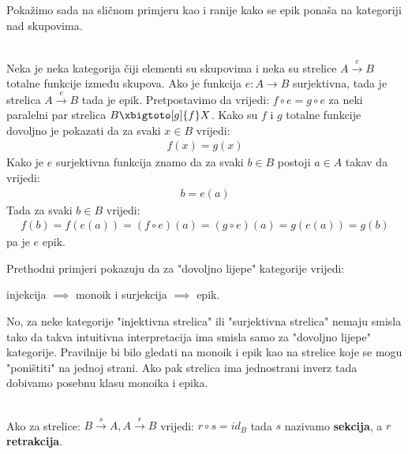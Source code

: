   Pokažimo sada na sličnom primjeru kao i ranije kako se epik ponaša na
  kategoriji nad skupovima.

\begin{example}\ \\
	
  \label{mon:pr:2}
	\noindent Neka je  neka kategorija čiji elementi su skupovima i neka su strelice
    $A \xrightarrow{e} B$ totalne funkcije između skupova.
    Ako je funkcija $e: A \to B$ surjektivna, tada je strelica $A \xrightarrow{e} B$ tada je epik.
    Pretpostavimo da vrijedi: $f \circ e = g \circ e$ za neki paralelni par strelica
     $B \xbigtoto[g]{f} X$.
    Kako su $f$ i $g$ totalne funkcije dovoljno je pokazati da za svaki $x \in B$
    vrijedi:
    \begin{align*}
      f(x) = g(x)
    \end{align*}
    Kako je $e$ surjektivna funkcija znamo da za svaki $b \in B$ postoji $a \in A$ takav da
    vrijedi:
    \begin{align*}
      b = e(a)
    \end{align*}
    Tada za svaki $b \in B$ vrijedi:
    \begin{align*}
      f(b) = f(e(a)) = (f \circ e)(a) = (g \circ e)(a) = g(e(a)) = g(b)
    \end{align*}
    pa je $e$ epik.\\
\end{example}

    Prethodni primjeri pokazuju da za "dovoljno lijepe" kategorije vrijedi:
    \begin{center}
      injekcija $\implies$ monoik \qquad i \qquad surjekcija $\implies$ epik.
    \end{center}
    No, za neke kategorije "injektivna strelica" ili "surjektivna strelica"
    nemaju smisla tako da takva intuitivna interpretacija ima smisla samo za
    "dovoljno lijepe" kategorije. Pravilnije bi bilo gledati na monoik i epik
    kao na strelice koje se mogu "poništiti" na jednoj strani. Ako pak strelica
    ima jednostrani inverz tada dobivamo posebnu klasu monoika i epika.\\
    
    \begin{definition}\ \\
    
      \noindent Ako za strelice:
       $B \xrightarrow{s} A, A \xrightarrow{r} B$
      vrijedi:
       $r \circ s = id_B$
      tada $s$ nazivamo \textbf{sekcija}, a $r$ \textbf{retrakcija}.
    \end{definition}
    
